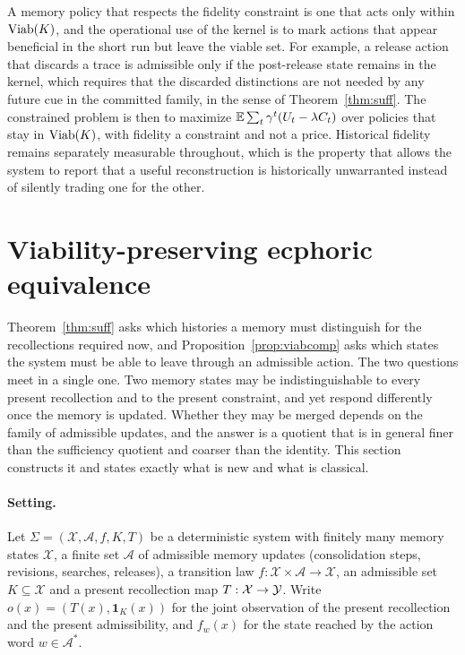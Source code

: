 A memory policy that respects the fidelity constraint is one that acts only within $\operatorname{Viab}(K)$, and the operational use of the kernel is to mark actions that appear beneficial in the short run but leave the viable set. For example, a release action that discards a trace is admissible only if the post-release state remains in the kernel, which requires that the discarded distinctions are not needed by any future cue in the committed family, in the sense of Theorem~\ref{thm:suff}. The constrained problem is then to maximize $\mathbb{E}\sum_t\gamma^t(U_t-\lambda C_t)$ over policies that stay in $\operatorname{Viab}(K)$, with fidelity a constraint and not a price. Historical fidelity remains separately measurable throughout, which is the property that allows the system to report that a useful reconstruction is historically unwarranted instead of silently trading one for the other.

\section*{Viability-preserving ecphoric equivalence}\label{sec:viabequiv37}

Theorem~\ref{thm:suff} asks which histories a memory must distinguish for the recollections required now, and Proposition~\ref{prop:viabcomp} asks which states the system must be able to leave through an admissible action. The two questions meet in a single one. Two memory states may be indistinguishable to every present recollection and to the present constraint, and yet respond differently once the memory is updated. Whether they may be merged depends on the family of admissible updates, and the answer is a quotient that is in general finer than the sufficiency quotient and coarser than the identity. This section constructs it and states exactly what is new and what is classical.

\paragraph{Setting.} Let $\Sigma=(\mathcal X,\mathcal A,f,K,T)$ be a deterministic system with finitely many memory states $\mathcal X$, a finite set $\mathcal A$ of admissible memory updates (consolidation steps, revisions, searches, releases), a transition law $f:\mathcal X\times\mathcal A\to\mathcal X$, an admissible set $K\subseteq\mathcal X$ and a present recollection map $T:\mathcal X\to\mathcal{Y}$. Write $o(x)=(T(x),\mathbf 1_K(x))$ for the joint observation of the present recollection and the present admissibility, and $f_w(x)$ for the state reached by the action word $w\in\mathcal A^\ast$.

